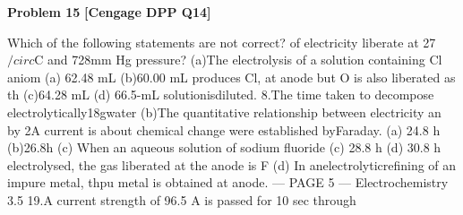 \begin{problembox}
\textbf{Problem 15} \hfill \textbf{[Cengage DPP Q14]}
\label{q:ext-cng_dpp_all_questions-15}

Which of the following statements are not correct?
of electricity liberate at 27$/circ$C and 728mm Hg pressure?
(a)The electrolysis of a solution containing Cl aniom
(a) 62.48 mL
(b)60.00 mL
produces Cl, at anode but O is also liberated as th
(c)64.28 mL
(d) 66.5-mL
solutionisdiluted.
8.The time taken to decompose electrolytically18gwater
(b)The quantitative relationship between electricity an
by 2A current is about
chemical change were established byFaraday.
(a) 24.8 h
(b)26.8h
(c) When an aqueous solution of sodium fluoride
(c) 28.8 h
(d) 30.8 h
electrolysed, the gas liberated at the anode is F
(d) In anelectrolyticrefining of an impure metal, thpu
metal is obtained at anode.
--- PAGE 5 ---
Electrochemistry 3.5
19.A current strength of 96.5 A is passed for 10 sec through
\end{problembox}

